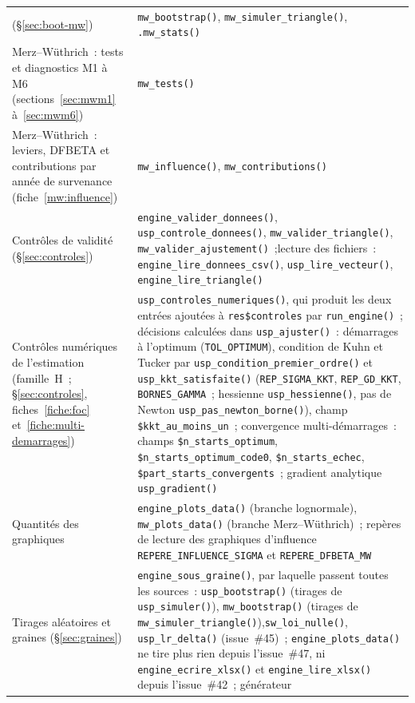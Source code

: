 \documentclass[a4paper,11pt]{article}
\newcommand{\code}[1]{\texttt{\small #1}}
\begin{document}
{\begin{longtable}{@{}p{5.6cm}p{9.4cm}@{}}
(§\ref{sec:boot-mw}) & \code{mw\_bootstrap()}, \code{mw\_simuler\_triangle()},
\code{.mw\_stats()} \\
Merz--Wüthrich~: tests et diagnostics M1 à M6 (sections~\ref{sec:mwm1}
à~\ref{sec:mwm6}) & \code{mw\_tests()} \\
Merz--Wüthrich~: leviers, DFBETA et contributions par année de survenance
(fiche~\ref{mw:influence}) & \code{mw\_influence()}, \code{mw\_contributions()} \\
Contrôles de validité (§\ref{sec:controles}) & \code{engine\_valider\_donnees()}, \code{usp\_controle\_donnees()},
\code{mw\_valider\_triangle()}, \code{mw\_valider\_ajustement()}~;\newline lecture des
fichiers~: \code{engine\_lire\_donnees\_csv()}, \code{usp\_lire\_vecteur()},
\code{engine\_lire\_triangle()} \\
Contrôles numériques de l'estimation (famille~H~; §\ref{sec:controles},
fiches~\ref{fiche:foc} et~\ref{fiche:multi-demarrages}) & \code{usp\_controles\_numeriques()},
qui produit les deux entrées ajoutées à \code{res\$controles} par \code{run\_engine()}~;
décisions calculées dans \code{usp\_ajuster()}~: démarrages à l'optimum (\code{TOL\_OPTIMUM}),
condition de Kuhn et Tucker par \code{usp\_condition\_premier\_ordre()} et
\code{usp\_kkt\_satisfaite()} (\code{REP\_SIGMA\_KKT}, \code{REP\_GD\_KKT}, \code{BORNES\_GAMMA}~;
hessienne \code{usp\_hessienne()}, pas de Newton \code{usp\_pas\_newton\_borne()}),
champ \code{\$kkt\_au\_moins\_un}~; convergence multi-démarrages~: champs
\code{\$n\_starts\_optimum}, \code{\$n\_starts\_optimum\_code0}, \code{\$n\_starts\_echec},
\code{\$part\_starts\_convergents}~; gradient analytique \code{usp\_gradient()} \\
Quantités des graphiques & \code{engine\_plots\_data()} (branche lognormale),\newline
\code{mw\_plots\_data()} (branche Merz--Wüthrich)~; repères de lecture des graphiques
d'influence \code{REPERE\_INFLUENCE\_SIGMA} et \code{REPERE\_DFBETA\_MW} \\
Tirages aléatoires et graines (§\ref{sec:graines}) & \code{engine\_sous\_graine()}, par
laquelle passent toutes les sources~: \code{usp\_bootstrap()} (tirages de
\code{usp\_simuler()}), \code{mw\_bootstrap()} (tirages de
\code{mw\_simuler\_triangle()}),\newline \code{sw\_loi\_nulle()}, \code{usp\_lr\_delta()}
(issue~\#45)~; \code{engine\_plots\_data()} ne tire plus rien depuis l'issue~\#47, ni
\code{engine\_ecrire\_xlsx()} et \code{engine\_lire\_xlsx()} depuis l'issue~\#42~; générateur

\end{longtable}}
\end{document}

